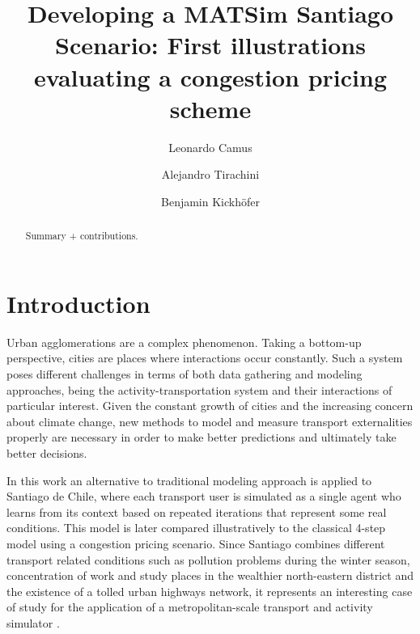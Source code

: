 \documentclass[Journal,letterpaper]{ascelike-new}
\begin{document}
\title{Developing a MATSim Santiago Scenario: First illustrations evaluating a congestion pricing scheme}

\author[1]{Leonardo Camus}
\author[2]{Alejandro Tirachini}
\author[3]{Benjamin Kickh\"ofer}


\maketitle



\begin{abstract}
Summary + contributions.
\end{abstract}

\section{Introduction}

Urban agglomerations are a complex phenomenon. Taking a bottom-up perspective, cities are places where interactions occur constantly. Such a system poses different challenges in terms of both data gathering and modeling approaches, being the activity-transportation system and their interactions of particular interest. Given the constant growth of cities and the increasing concern about climate change, new methods to model and measure transport externalities properly are necessary in order to make better predictions and ultimately take better decisions.

In this work an alternative to traditional modeling approach is applied to Santiago de Chile, where each transport user is simulated as a single agent who learns from its context based on repeated iterations that represent some real conditions. This model is later compared illustratively to the classical 4-step model using a congestion pricing scenario. Since Santiago combines different transport related conditions such as pollution problems during the winter season, concentration of work and study places in the wealthier north-eastern district and the existence of a tolled urban highways network, it represents an interesting case of study for the application of a metropolitan-scale transport and activity simulator \citep{KickhoeferEtAl2016}.
\end{document}
